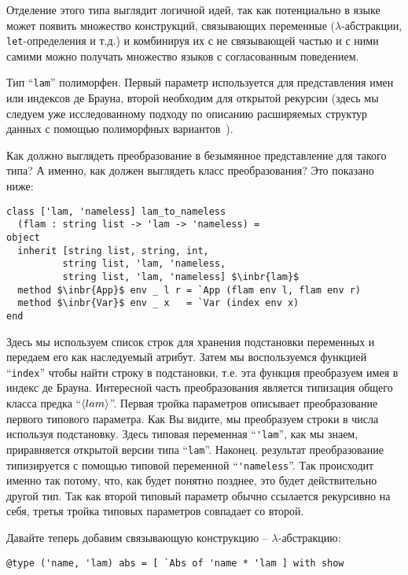 Отделение этого типа выглядит логичной идей, так как потенциально в языке может появить множество конструкций, связывающих переменные 
($\lambda$-абстракции, \lstinline=let=-определения и т.д.) и комбинируя их с не связывающей частью и с ними самими можно получать множество языков с согласованным поведением.

Тип ``\lstinline{lam}'' полиморфен. Первый параметр используется для представления имен или индексов де Брауна, второй необходим для открытой рекурсии (здесь мы следуем уже исследованному подходу по описанию расширяемых структур данных с помощью полиморфных 
вариантов~\cite{PolyVarReuse}).

Как должно выглядеть преобразование в безымянное представление для такого типа? А именно, как должен выглядеть класс преобразования? Это показано ниже:

\begin{lstlisting}
class ['lam, 'nameless] lam_to_nameless
  (flam : string list -> 'lam -> 'nameless) =
object
  inherit [string list, string, int,
          string list, 'lam, 'nameless,
          string list, 'lam, 'nameless] $\inbr{lam}$
  method $\inbr{App}$ env _ l r = `App (flam env l, flam env r)
  method $\inbr{Var}$ env _ x   = `Var (index env x)
end
\end{lstlisting}

Здесь мы используем список строк для хранения подстановки переменных и  передаем его как наследуемый атрибут. Затем мы воспользуемся функцией 
``\lstinline{index}'' чтобы найти строку в подстановки, т.е.  эта функция преобразуем имея в индекс де Брауна. 
Интересной часть преобразования является типизация общего класса предка ``$\left<lam\right>$''. 
Первая тройка параметров описывает преобразование первого типового параметра. Как Вы видите, мы преобразуем строки в числа используя подстановку.
Здесь типовая переменная ``\lstinline{'lam}'', как мы знаем, приравняется открытой версии типа ``\lstinline{lam}''.
Наконец. результат преобразование типизируется с помощью типовой переменной ``\lstinline{'nameless}''. 
Так происходит именно так потому, что, как будет понятно позднее,  это будет действительно другой тип.
Так как второй типовый параметр обычно ссылается рекурсивно на себя, третья тройка типовых параметров совпадает со второй.

Давайте теперь добавим связывающую конструкцию -- $\lambda$-абстракцию:

\begin{lstlisting}
@type ('name, 'lam) abs = [ `Abs of 'name * 'lam ] with show
\end{lstlisting}

